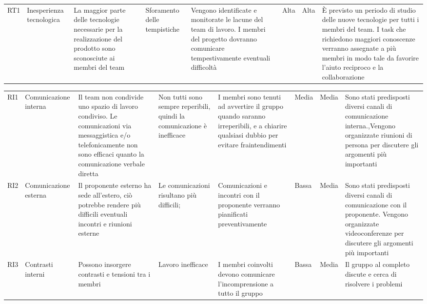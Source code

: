 \begin{landscape}
\begin{table}[h]
\begin{center}
\begin{tabular}{p{0.6cm}|p{1.8cm}|p{4cm}|p{2cm}|p{4cm}|p{0.9cm}|p{0.8cm}|p{4cm}}
RT1 & Inesperienza tecnologica & La maggior parte delle tecnologie necessarie per la realizzazione del prodotto sono sconosciute ai membri del team & Sforamento delle tempistiche & Vengono identificate e monitorate le lacune del team di lavoro. I membri del progetto dovranno comunicare tempestivamente eventuali difficoltà & Alta & Alta & È previsto un periodo di studio delle nuove tecnologie per tutti i membri del team. I task che richiedono maggiori conoscenze verranno assegnate a più membri in modo tale da favorire l’aiuto reciproco e la collaborazione \\                                                                                                                                                                                                                              
\end{tabular}
\end{center}
\end{table}
\begin{table}[h]
\begin{center}
\begin{tabular}{p{0.6cm}|p{1.8cm}|p{4cm}|p{2cm}|p{4cm}|p{0.9cm}|p{0.8cm}|p{4cm}}
RI1 & Comunicazione interna & Il team non condivide uno spazio di lavoro condiviso. Le comunicazioni via messaggistica e/o telefonicamente non sono efficaci quanto la comunicazione verbale diretta & Non tutti sono sempre reperibili, quindi la comunicazione è inefficace & I membri sono tenuti ad avvertire il gruppo quando saranno irreperibili, e a chiarire qualsiasi dubbio per evitare fraintendimenti & Media & Media & Sono stati predisposti diversi canali di comunicazione interna.,Vengono organizzate riunioni di persona per discutere gli argomenti più importanti       \\
RI2 & Comunicazione esterna & Il proponente esterno ha sede all’estero, ciò potrebbe rendere più difficili eventuali incontri e riunioni esterne                                                     & Le comunicazioni risultano più difficili;                              & Comunicazioni e incontri con il proponente verranno pianificati preventivamente                                                     & Bassa & Media & Sono stati predisposti diversi canali di comunicazione con il proponente. Vengono organizzate videoconferenze per discutere gli argomenti più importanti \\
RI3 & Contrasti interni     & Possono insorgere contrasti e tensioni tra i membri                                                                                                                  & Lavoro inefficace                                                      & I membri coinvolti devono comunicare l’incomprensione a tutto il gruppo                                                            & Bassa & Media & Il gruppo al completo discute e cerca di risolvere i problemi  \\

\end{tabular}
\end{center}
\end{table}
\end{landscape}
